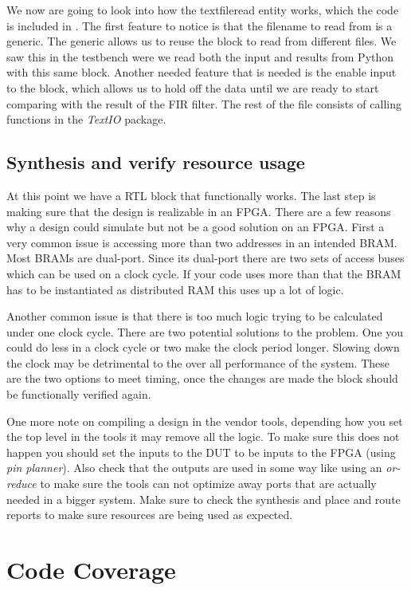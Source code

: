 We now are going to look into how the textfileread entity works, which the code is included in . The first feature to notice is that the filename to read from is a generic. The generic allows us to reuse the block to read from different files. We saw this in the testbench were we read both the input and results from Python with this same block. Another needed feature that is needed is the enable input to the block, which allows us to hold off the data until we are ready to start comparing with the result of the \ac{FIR} filter. The rest of the file consists of calling functions in the \emph{TextIO} package.
	
\subsection{Synthesis and verify resource usage}

At this point we have a \ac{RTL} block that functionally works. The last step is making sure that the design is realizable in an \ac{FPGA}. There are a few reasons why a design could simulate but not be a good solution on an \ac{FPGA}. First a very common issue is accessing more than two addresses in an intended \ac{BRAM}. Most \ac{BRAM}s are dual-port. Since its dual-port there are two sets of access buses which can be used on a clock cycle. If your code uses more than that the \ac{BRAM} has to be instantiated as distributed \ac{RAM} this uses up a lot of logic.

Another common issue is that there is too much logic trying to be calculated under one clock cycle. There are two potential solutions to the problem. One you could do less in a clock cycle or two make the clock period longer. Slowing down the clock may be detrimental to the over all performance of the system. These are the two options to meet timing, once the changes are made the block should be functionally verified again.  

One more note on compiling a design in the vendor tools, depending how you set the top level in the tools it may remove all the logic. To make sure this does not happen you should set the inputs to the \ac{DUT} to be inputs to the FPGA (using \emph{pin planner}). Also check that the outputs are used in some way like using an \emph{or-reduce} to make sure the tools can not optimize away ports that are actually needed in a bigger system. Make sure to check the synthesis and place and route reports to make sure resources are being used as expected. 
		
\section{Code Coverage}
	
